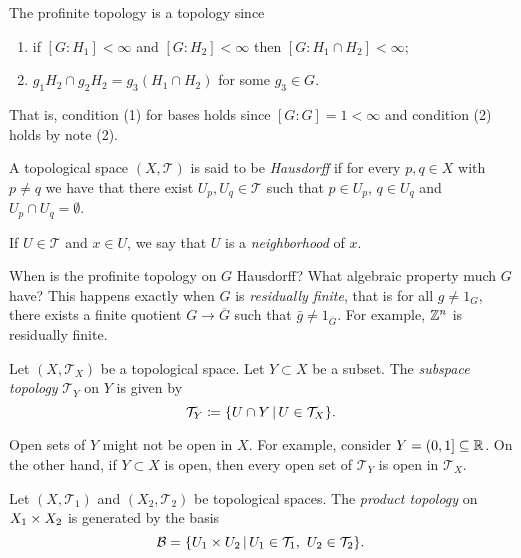 \documentclass[12pt]{book} %
\newcommand{\T}{\mathcal T}
\newcommand{\B}{\mathcal B}
\begin{document}
\begin{note}
The profinite topology is a topology since
\begin{enumerate}
\item if \( [G : H_1] < \infty \) and \( [G : H_2] < \infty \) then \( [G : H_1 \cap H_2] < \infty \);
\item \( g_1 H_2 \cap g_2 H_2 = g_3 (H_1 \cap H_2) \) for some \( g_3 \in G \).
\end{enumerate}
That is, condition (1) for bases holds since \( [G : G] = 1 < \infty \) and condition (2) holds by note (2).
\end{note}

\begin{definition}
A topological space \( (X, \T) \) is said to be \emph{Hausdorff} if for every \( p, q \in X \) with \( p \neq q \) we have that there exist \( U_p, U_q \in \T \) such that \( p \in U_p \), \( q \in U_q \) and \( U_p \cap U_q = \emptyset \).
\end{definition}

\begin{definition}
If \( U \in \T \) and \( x \in U \), we say that \( U \) is a \emph{neighborhood} of \( x \).
\end{definition}

\begin{note}
When is the profinite topology on \( G \) Hausdorff?
What algebraic property much \( G \) have?
This happens exactly when \( G \) is \emph{residually finite}, that is for all \( g \neq 1_G \), there exists a finite quotient \( G \to \overline G \) such that \( \bar g \neq 1_{\overline G} \).
For example, \( \mathbb{Z}^n \) is residually finite.
\end{note}

\begin{definition}
Let \( (X, \T_X) \) be a topological space.
Let \( Y \subset X \) be a subset.
The \emph{subspace topology} \( \T_Y \) on \( Y \) is given by
\[ \T_Y \coloneqq \set{U \cap Y \given U \in \T_X}. \]
\end{definition}

\begin{note}
Open sets of \( Y \) might not be open in \( X \).
For example, consider \( Y = (0, 1] \subseteq \mathbb{R} \).
On the other hand, if \( Y \subset X \) is open, then every open set of \( \T_Y \) is open in \( \T_X \).
\end{note}

\begin{definition}
Let \( (X, \T_1) \) and \( (X_2, \T_2) \) be topological spaces.
The \emph{product topology} on \( X_1 \times X_2 \) is generated by the basis
\[ \B = \set{U_1 \cross U_2 \given U_1 \in \T_1,\ U_2 \in \T_2}. \]
\end{definition}
\end{document}
